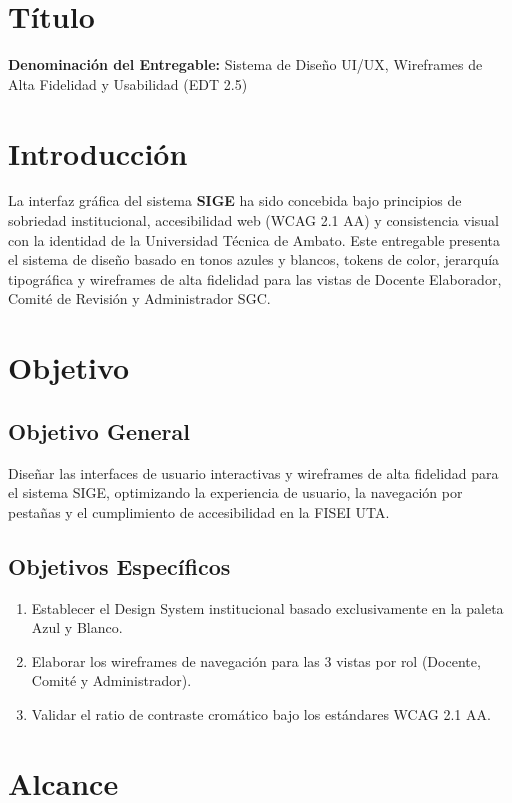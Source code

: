 \documentclass[12pt,a4paper]{article}
\begin{document}
\section{Título}
\textbf{Denominación del Entregable:} Sistema de Diseño UI/UX, Wireframes de Alta Fidelidad y Usabilidad (EDT 2.5)



\section{Introducción}
La interfaz gráfica del sistema \textbf{SIGE} ha sido concebida bajo principios de sobriedad institucional, accesibilidad web (WCAG 2.1 AA) y consistencia visual con la identidad de la Universidad Técnica de Ambato. Este entregable presenta el sistema de diseño basado en tonos azules y blancos, tokens de color, jerarquía tipográfica y wireframes de alta fidelidad para las vistas de Docente Elaborador, Comité de Revisión y Administrador SGC.

\section{Objetivo}

\subsection{Objetivo General}
Diseñar las interfaces de usuario interactivas y wireframes de alta fidelidad para el sistema SIGE, optimizando la experiencia de usuario, la navegación por pestañas y el cumplimiento de accesibilidad en la FISEI UTA.

\subsection{Objetivos Específicos}
\begin{enumerate}[leftmargin=1.5em, itemsep=2pt, topsep=2pt]
    \item Establecer el Design System institucional basado exclusivamente en la paleta Azul y Blanco.
    \item Elaborar los wireframes de navegación para las 3 vistas por rol (Docente, Comité y Administrador).
    \item Validar el ratio de contraste cromático bajo los estándares WCAG 2.1 AA.
\end{enumerate}

\section{Alcance}
\end{document}
